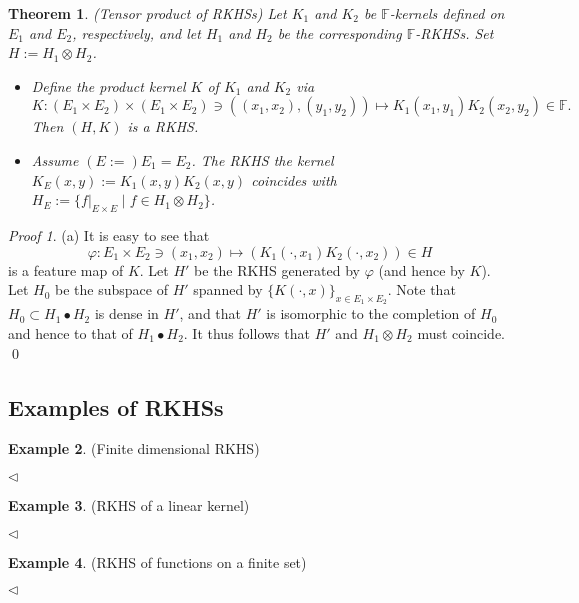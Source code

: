 \documentclass[a4paper,12pt]{article}
\newtheorem{thm}{Theorem}[section]
\theoremstyle{remark}
\newtheorem*{prf}{Proof}
\theoremstyle{definition}
\theoremstyle{definition}
\newtheorem{ex}[thm]{Example}
\theoremstyle{definition}
\newcommand{\fin}{\hfill \( \triangleleft \) }
\begin{document}
\begin{thm} (Tensor product of RKHSs)
	Let \( K_1 \) and \( K_2 \) be \( \mathbb{F} \)-kernels defined on \( E_1 \) and \( E_2 \), respectively, and let \( H_1 \) and \( H_2 \) be the corresponding \( \mathbb{F} \)-RKHSs. Set \( H:=H_1 \otimes H_2 \).
	\begin{itemize}
		\item[(a)] Define the product kernel \( K \) of \( K_1 \) and \( K_2 \) via
		      \begin{equation*}
			      K:(E_1 \times E_2) \times (E_1 \times E_2) \ni \left( (x_1, x_2), (y_1,y_2) \right) \mapsto K_1(x_1,y_1)K_2(x_2,y_2) \in \mathbb{F}.
		      \end{equation*}
		      Then \( (H,K) \) is a RKHS.
		\item[(b)] Assume \( (E:=) E_1 = E_2 \). The RKHS the kernel \( K_E(x,y) :=K_1(x,y)K_2(x,y) \) coincides with \( H_E:=\{f|_{E \times E} \mid f \in H_1 \otimes H_2\} \).
	\end{itemize}
\end{thm}
\begin{prf}
	(a) It is easy to see that
	\begin{equation*}
		\varphi:E_1 \times E_2 \ni (x_1,x_2) \mapsto \left( K_1(\cdot ,x_1)K_2(\cdot ,x_2) \right)\in H
	\end{equation*}
	is a feature map of \( K \). Let \( H' \) be the RKHS generated by \( \varphi \) (and hence by \( K \)). Let \( H_0 \) be the subspace of \( H' \) spanned by \( \{K(\cdot ,x)\}_{x \in E_1 \times E_2} \).
	Note that \( H_0 \subset H_1 \bullet H_2\) is dense in \( H' \), and that \( H' \) is isomorphic to the completion of \( H_0 \) and hence to that of \( H_1 \bullet H_2 \). It thus follows that \( H' \) and \( H_1 \otimes H_2 \) must coincide.
	\qed\end{prf}

\subsection{Examples of RKHSs}

\begin{ex} (Finite dimensional RKHS)

	\fin\end{ex}

\begin{ex} (RKHS of a linear kernel)

	\fin\end{ex}

\begin{ex} (RKHS of functions on a finite set)

	\fin\end{ex}
\end{document}
